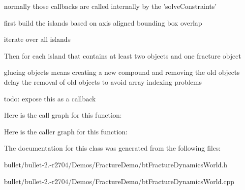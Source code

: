 normally those callbacks are called internally by the 'solve\+Constraints' 

first build the islands based on axis aligned bounding box overlap

iterate over all islands

Then for each island that contains at least two objects and one fracture object

glueing objects means creating a new compound and removing the old objects delay the removal of old objects to avoid array indexing problems

todo\+: expose this as a callback 

Here is the call graph for this function\+:




Here is the caller graph for this function\+:




The documentation for this class was generated from the following files\+:\begin{DoxyCompactItemize}
\item 
bullet/bullet-\/2.-\/r2704/\+Demos/\+Fracture\+Demo/bt\+Fracture\+Dynamics\+World.\+h\item 
bullet/bullet-\/2.-\/r2704/\+Demos/\+Fracture\+Demo/bt\+Fracture\+Dynamics\+World.\+cpp\end{DoxyCompactItemize}
